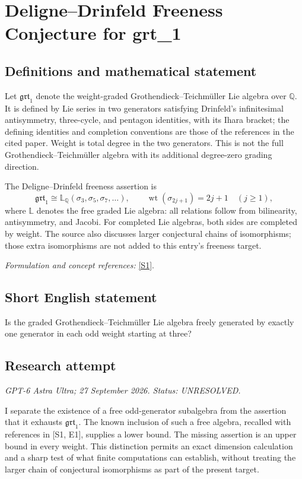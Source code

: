 \documentclass[11pt]{article}
\begin{document}
\section*{\texorpdfstring{Deligne–Drinfeld Freeness Conjecture for grt\_1}{Deligne–Drinfeld Freeness Conjecture for grt\_1}}\label{30006943}
\subsection{Definitions and mathematical statement}
Let $\mathfrak{grt}_1$ denote the weight-graded Grothendieck--Teichm\"uller Lie algebra over ${\mathbb{Q}}$. It is defined by Lie series in two generators satisfying Drinfeld's infinitesimal antisymmetry, three-cycle, and pentagon identities, with its Ihara bracket; the defining identities and completion conventions are those of the references in the cited paper. Weight is total degree in the two generators. This is not the full Grothendieck--Teichm\"uller algebra with its additional degree-zero grading direction.

The Deligne--Drinfeld freeness assertion is
\[
 \mathfrak{grt}_1\cong
 \mathbb L_{{\mathbb{Q}}}(\sigma_3,\sigma_5,\sigma_7,\ldots),
 \qquad \operatorname{wt}(\sigma_{2j+1})=2j+1\quad(j\ge1),
\]
where $\mathbb L$ denotes the free graded Lie algebra: all relations follow from bilinearity, antisymmetry, and Jacobi. For completed Lie algebras, both sides are completed by weight. The source also discusses larger conjectural chains of isomorphisms; those extra isomorphisms are not added to this entry's freeness target.
\par\smallskip\textit{Formulation and concept references:} \href{https://arxiv.org/html/2508.08081}{[S1]}.

\subsection{Short English statement}
Is the graded Grothendieck--Teichm\"uller Lie algebra freely generated by exactly one generator in each odd weight starting at three?
\subsection{Research attempt}
\textit{GPT-6 Astra Ultra; 27 September 2026. Status: UNRESOLVED.}

I separate the existence of a free odd-generator subalgebra from the
assertion that it exhausts $\mathfrak{grt}_1$. The known inclusion of
such a free algebra, recalled with references in [S1, E1], supplies a
lower bound. The missing assertion is an upper bound in every weight.
This distinction permits an exact dimension calculation and a sharp test
of what finite computations can establish, without treating the larger
chain of conjectural isomorphisms as part of the present target.
\end{document}
